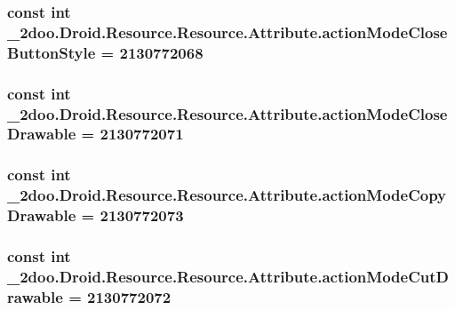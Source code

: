 \hypertarget{class__2doo_1_1_droid_1_1_resource_1_1_attribute_b9afc7f1a6438da768dbe4726dec02e6}{
\subsubsection[{actionModeCloseButtonStyle}]{\setlength{\rightskip}{0pt plus 5cm}const int \_\-2doo.Droid.Resource.Resource.Attribute.actionModeCloseButtonStyle = 2130772068}}
\label{class__2doo_1_1_droid_1_1_resource_1_1_attribute_b9afc7f1a6438da768dbe4726dec02e6}


\hypertarget{class__2doo_1_1_droid_1_1_resource_1_1_attribute_9564a273735fb79e7e948b907916ab56}{
\subsubsection[{actionModeCloseDrawable}]{\setlength{\rightskip}{0pt plus 5cm}const int \_\-2doo.Droid.Resource.Resource.Attribute.actionModeCloseDrawable = 2130772071}}
\label{class__2doo_1_1_droid_1_1_resource_1_1_attribute_9564a273735fb79e7e948b907916ab56}


\hypertarget{class__2doo_1_1_droid_1_1_resource_1_1_attribute_0b88e47b4811d42e3242616fc01c0304}{
\subsubsection[{actionModeCopyDrawable}]{\setlength{\rightskip}{0pt plus 5cm}const int \_\-2doo.Droid.Resource.Resource.Attribute.actionModeCopyDrawable = 2130772073}}
\label{class__2doo_1_1_droid_1_1_resource_1_1_attribute_0b88e47b4811d42e3242616fc01c0304}


\hypertarget{class__2doo_1_1_droid_1_1_resource_1_1_attribute_83463c8999341aef60a1af73e0e0e0eb}{
\subsubsection[{actionModeCutDrawable}]{\setlength{\rightskip}{0pt plus 5cm}const int \_\-2doo.Droid.Resource.Resource.Attribute.actionModeCutDrawable = 2130772072}}
\label{class__2doo_1_1_droid_1_1_resource_1_1_attribute_83463c8999341aef60a1af73e0e0e0eb}


